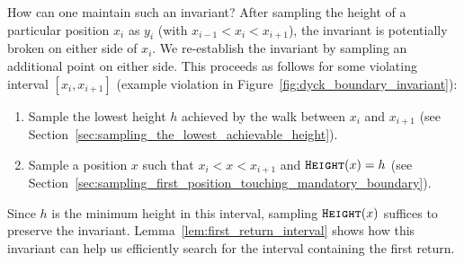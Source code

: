 How can one maintain such an invariant?
After sampling the height of a particular position $x_i$ as $y_i$ (with $x_{i-1} < x_i < x_{i+1}$),
the invariant is potentially broken on either side of $x_i$.
We re-establish the invariant by sampling an additional point on either side.
This proceeds as follows for some violating interval $[x_i, x_{i+1}]$
(example violation in Figure~\ref{fig:dyck_boundary_invariant}):
\begin{enumerate}
    \item Sample the lowest height $h$ achieved by the walk between $x_i$ and $x_{i+1}$ (see Section~\ref{sec:sampling_the_lowest_achievable_height}).
    \item Sample a position $x$ such that $x_i < x < x_{i+1}$ and $\texttt{\textsc{Height}}(x) = h$
    (see Section~\ref{sec:sampling_first_position_touching_mandatory_boundary}).
\end{enumerate}
Since $h$ is the minimum height in this interval, sampling $\texttt{\textsc{Height}}(x)$ suffices to preserve the invariant.
Lemma~\ref{lem:first_return_interval} shows how this invariant can help us efficiently search for the interval containing the first return.


